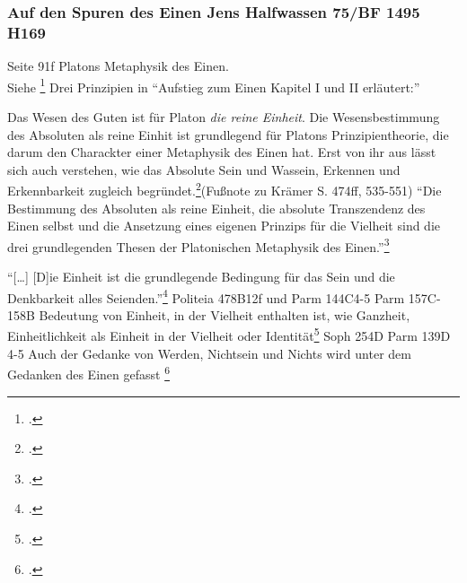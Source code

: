 \subsubsection*{Auf den Spuren des Einen Jens Halfwassen  75/BF 1495 H169}
Seite 91f Platons Metaphysik des Einen.\\
Siehe \footcite[][]{halfwassen2015spuren}
Drei Prinzipien in \enquote{Aufstieg zum Einen Kapitel I und II erläutert:} 

Das Wesen des Guten ist für Platon \emph{die reine Einheit}. Die Wesensbestimmung des Absoluten als reine Einhit ist grundlegend für Platons Prinzipientheorie, die darum den Charackter einer Metaphysik des Einen hat. Erst von ihr aus lässt sich auch verstehen, wie das Absolute Sein und Wassein, Erkennen und Erkennbarkeit zugleich begründet.\footcite[][S. 96]{halfwassen2015spuren}(Fußnote zu Krämer S. 474ff, 535-551)
\enquote{Die Bestimmung des Absoluten als reine Einheit, die absolute Transzendenz des Einen selbst und die Ansetzung eines eigenen Prinzips für die Vielheit sind die drei grundlegenden Thesen der Platonischen Metaphysik des Einen.}\footcite[][S. 96]{halfwassen2015spuren}

\enquote{[\dots] [D]ie Einheit ist die grundlegende Bedingung für das Sein und die Denkbarkeit alles Seienden.}\footcite[vgl.][S. 97]{halfwassen2015spuren} Politeia 478B12f und Parm 144C4-5
 Parm 157C-158B
Bedeutung von Einheit, in der Vielheit enthalten ist, wie Ganzheit, Einheitlichkeit als Einheit in der Vielheit oder Identität\footcite[vgl.][S. 97]{halfwassen2015spuren} Soph 254D Parm 139D 4-5
Auch der Gedanke von Werden, Nichtsein und Nichts wird unter dem Gedanken des Einen gefasst \footcite[vgl.][S. 97]{halfwassen2015spuren}

